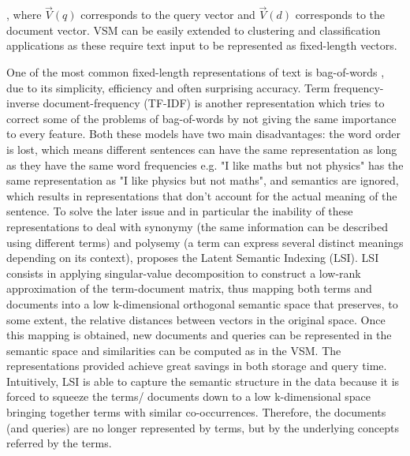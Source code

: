 \documentclass[a4paper]{article}
\begin{document}
, where $\overrightarrow{V}(q)$ corresponds to the query vector and $\overrightarrow{V}(d)$ corresponds to the document vector. VSM can be easily extended to clustering and classification applications as these require text input to be represented as fixed-length vectors. 

One of the most common fixed-length representations of text is bag-of-words \citep{harris1954}, due to its simplicity, efficiency and often surprising accuracy. Term frequency-inverse document-frequency (TF-IDF) \citep{jones1972} is another representation which tries to correct some of the problems of bag-of-words by not giving the same importance to every feature. Both these models have two main disadvantages: the word order is lost, which means different sentences can have the same representation as long as they have the same word frequencies e.g. "I like maths but not physics" has the same representation as "I like physics but not maths", and semantics are ignored, which results in representations that don't account for the actual meaning of the sentence. To solve the later issue and in particular the inability of these representations to deal with synonymy (the same information can be described using different terms) and polysemy (a term can express several distinct meanings depending on its context), \citet{deerwester1990} proposes the Latent Semantic Indexing (LSI). LSI consists in applying singular-value decomposition to construct a low-rank approximation of the term-document matrix, thus mapping both terms and documents into a low k-dimensional orthogonal semantic space that preserves, to some extent, the relative distances between vectors in the original space. Once this mapping is obtained, new documents and queries can be represented in the semantic space and similarities can be computed as in the VSM. The representations provided achieve great savings in both storage and query time. Intuitively, LSI is able to capture the semantic structure in the data because it is forced to squeeze the terms/ documents down to a low k-dimensional space bringing together terms with similar co-occurrences. Therefore, the documents (and queries) are no longer represented by terms, but by the underlying concepts referred by the terms. 
\end{document}
